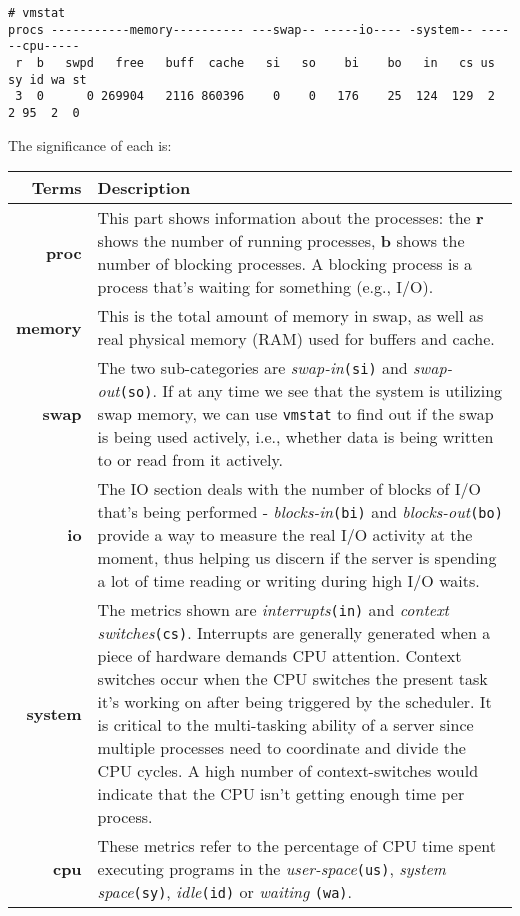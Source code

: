 \vspace{-15pt}
\begin{verbatim}
# vmstat
procs -----------memory---------- ---swap-- -----io---- -system-- ------cpu-----
 r  b   swpd   free   buff  cache   si   so    bi    bo   in   cs us sy id wa st
 3  0      0 269904   2116 860396    0    0   176    25  124  129  2  2 95  2  0
\end{verbatim}
\vspace{-10pt}	

\noindent
The significance of each is:

\noindent
\begin{tabular}{rM{0.84}}
	\toprule
	\textbf{Terms} &\textbf{Description} \\
	\midrule
	\textbf{proc}	&This part shows information about the processes: the \textbf{r} shows the number of running processes, \textbf{b} shows the number of blocking processes. A blocking process is a process that's waiting for something (e.g., I/O). \\
	\midrule
	\textbf{memory}	&This is the total amount of memory in swap, as well as real physical memory (RAM) used for buffers and cache. \\
	\midrule
	\textbf{swap}	&The two sub-categories are \textit{swap-in}\verb|(si)| and \textit{swap-out}\verb|(so)|. If at any time we see that the system is utilizing swap memory, we can use \verb|vmstat| to find out if the swap is being used actively, i.e., whether data is being written to or read from it actively. \\
	\midrule
	\textbf{io}	&The IO section deals with the number of blocks of I/O that's being performed - \textit{blocks-in}\verb|(bi)| and \textit{blocks-out}\verb|(bo)| provide a way to measure the real I/O activity at the moment, thus helping us discern if the server is spending a lot of time reading or writing during high I/O waits. \\
	\midrule
	\textbf{system}	&The metrics shown are \textit{interrupts}\verb|(in)| and \textit{context switches}\verb|(cs)|. Interrupts are generally generated when a piece of hardware demands CPU attention. Context switches occur when the CPU switches the present task it's working on after being triggered by the scheduler. It is critical to the multi-tasking ability of a server since multiple processes need to coordinate and divide the CPU cycles. A high number of context-switches would indicate that the CPU isn't getting enough time per process.\\
	\midrule
	\textbf{cpu}	&These metrics refer to the percentage of CPU time spent executing programs in the \textit{user-space}\verb|(us)|, \textit{system space}\verb|(sy)|, \textit{idle}\verb|(id)| or \textit{waiting} \verb|(wa)|.\\
	\bottomrule
\end{tabular}

